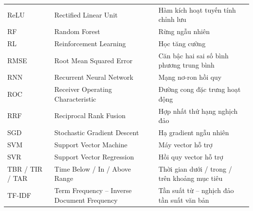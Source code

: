 \begin{spacing}{1.1}
\begin{longtable}{@{}L{2.3cm}L{6.3cm}L{6.0cm}@{}}
ReLU & Rectified Linear Unit & Hàm kích hoạt tuyến tính chỉnh lưu \\
RF & Random Forest & Rừng ngẫu nhiên \\
RL & Reinforcement Learning & Học tăng cường \\
RMSE & Root Mean Squared Error & Căn bậc hai sai số bình phương trung bình \\
RNN & Recurrent Neural Network & Mạng nơ-ron hồi quy \\
ROC & Receiver Operating Characteristic & Đường cong đặc trưng hoạt động \\
RRF & Reciprocal Rank Fusion & Hợp nhất thứ hạng nghịch đảo \\
SGD & Stochastic Gradient Descent & Hạ gradient ngẫu nhiên \\
SVM & Support Vector Machine & Máy vector hỗ trợ \\
SVR & Support Vector Regression & Hồi quy vector hỗ trợ \\
TBR / TIR / TAR & Time Below / In / Above Range & Thời gian dưới / trong / trên khoảng mục tiêu \\
TF-IDF & Term Frequency – Inverse Document Frequency & Tần suất từ – nghịch đảo tần suất văn bản \\
\bottomrule
\end{longtable}
\addtocounter{table}{-1}
\end{spacing}
